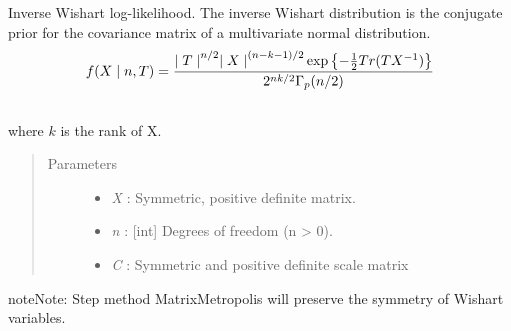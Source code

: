 \documentclass[letterpaper,10pt,english]{sphinxmanual}
\begin{document}
\begin{fulllineitems}
\label{distributions:pymc.distributions.inverse_wishart_like}
Inverse Wishart log-likelihood. The inverse Wishart distribution
is the conjugate prior for the covariance matrix of a multivariate
normal distribution.
\begin{gather}
\begin{split}f(X \mid n, T) = \frac{{\mid T \mid}^{n/2}{\mid X
\mid}^{(n-k-1)/2} \exp\left\{ -\frac{1}{2} Tr(TX^{-1})
\right\}}{2^{nk/2} \Gamma_p(n/2)}\end{split}\notag\\\begin{split}\end{split}\notag
\end{gather}
where $k$ is the rank of X.
\begin{quote}\begin{description}
\item[{Parameters }] \leavevmode\begin{itemize}
\item {} 
\emph{X} : Symmetric, positive definite matrix.

\item {} 
\emph{n} : {[}int{]} Degrees of freedom (n \textgreater{} 0).

\item {} 
\emph{C} : Symmetric and positive definite scale matrix

\end{itemize}

\end{description}\end{quote}

\begin{notice}{note}{Note:}
Step method MatrixMetropolis will preserve the symmetry of
Wishart variables.
\end{notice}

\end{fulllineitems}

\end{document}
